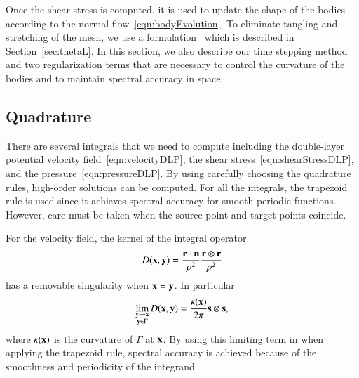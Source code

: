 \documentclass[preprint, 10pt]{elsarticle}
\begin{document}
Once the shear stress is computed, it is used to update the shape of the
bodies according to the normal flow~\eqref{eqn:bodyEvolution}.  To
eliminate tangling and stretching of the mesh, we use a \thL
formulation~\cite{hou-low-she1994} which is described in
Section~\ref{sec:thetaL}.  In this section, we also describe our time
stepping method and two regularization terms that are necessary to
control the curvature of the bodies and to maintain spectral accuracy in
space.


\subsection{Quadrature} 
\label{sec:quadrature}
There are several integrals that we need to compute including the
double-layer potential velocity field~\eqref{eqn:velocityDLP}, the shear
stress~\eqref{eqn:shearStressDLP}, and the
pressure~\eqref{eqn:pressureDLP}.  By using carefully choosing the
quadrature rules, high-order solutions can be computed.  For all the
integrals, the trapezoid rule is used since it achieves spectral
accuracy for smooth periodic functions.  However, care must be taken
when the source point and target points coincide.

For the velocity field, the kernel of the integral operator
\begin{align*}
  D({\mathbf{x}},{\mathbf{y}}) = \frac{{\mathbf{r}} \cdot {\mathbf{n}}}{\rho^2} 
               \frac{{\mathbf{r}} \otimes {\mathbf{r}}}{\rho^2}
\end{align*}
has a removable singularity when ${\mathbf{x}} = {\mathbf{y}}$.  In particular
\begin{align*}
  \lim_{\substack{{\mathbf{y}} \rightarrow {\mathbf{x}} \\ {\mathbf{y}} \in \Gamma}} D({\mathbf{x}},{\mathbf{y}}) = 
  \frac{\kappa({\mathbf{x}})}{2\pi}{\mathbf{s}} \otimes {\mathbf{s}},
\end{align*}
where $\kappa({\mathbf{x}})$ is the curvature of $\Gamma$ at ${\mathbf{x}}$.  By using
this limiting term in when applying the trapezoid rule, spectral
accuracy is achieved because of the smoothness and periodicity of the
integrand~\cite{tre-wei2014}.
\end{document}
